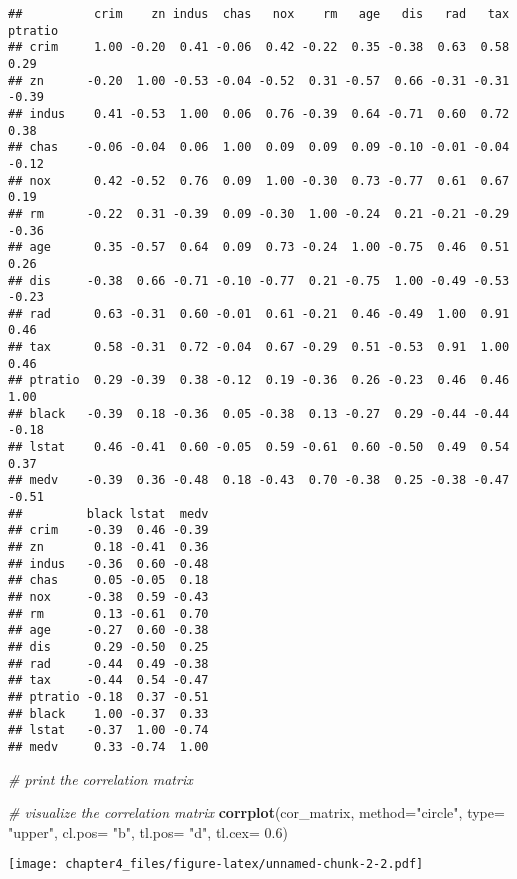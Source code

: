 \documentclass[
]{article}
\newenvironment{Shaded}{\begin{snugshade}}{\end{snugshade}}
\newcommand{\CommentTok}[1]{\textcolor[rgb]{0.56,0.35,0.01}{\textit{#1}}}
\newcommand{\DataTypeTok}[1]{\textcolor[rgb]{0.13,0.29,0.53}{#1}}
\newcommand{\FloatTok}[1]{\textcolor[rgb]{0.00,0.00,0.81}{#1}}
\newcommand{\KeywordTok}[1]{\textcolor[rgb]{0.13,0.29,0.53}{\textbf{#1}}}
\newcommand{\NormalTok}[1]{#1}
\newcommand{\StringTok}[1]{\textcolor[rgb]{0.31,0.60,0.02}{#1}}
\begin{document}
\begin{verbatim}
##          crim    zn indus  chas   nox    rm   age   dis   rad   tax ptratio
## crim     1.00 -0.20  0.41 -0.06  0.42 -0.22  0.35 -0.38  0.63  0.58    0.29
## zn      -0.20  1.00 -0.53 -0.04 -0.52  0.31 -0.57  0.66 -0.31 -0.31   -0.39
## indus    0.41 -0.53  1.00  0.06  0.76 -0.39  0.64 -0.71  0.60  0.72    0.38
## chas    -0.06 -0.04  0.06  1.00  0.09  0.09  0.09 -0.10 -0.01 -0.04   -0.12
## nox      0.42 -0.52  0.76  0.09  1.00 -0.30  0.73 -0.77  0.61  0.67    0.19
## rm      -0.22  0.31 -0.39  0.09 -0.30  1.00 -0.24  0.21 -0.21 -0.29   -0.36
## age      0.35 -0.57  0.64  0.09  0.73 -0.24  1.00 -0.75  0.46  0.51    0.26
## dis     -0.38  0.66 -0.71 -0.10 -0.77  0.21 -0.75  1.00 -0.49 -0.53   -0.23
## rad      0.63 -0.31  0.60 -0.01  0.61 -0.21  0.46 -0.49  1.00  0.91    0.46
## tax      0.58 -0.31  0.72 -0.04  0.67 -0.29  0.51 -0.53  0.91  1.00    0.46
## ptratio  0.29 -0.39  0.38 -0.12  0.19 -0.36  0.26 -0.23  0.46  0.46    1.00
## black   -0.39  0.18 -0.36  0.05 -0.38  0.13 -0.27  0.29 -0.44 -0.44   -0.18
## lstat    0.46 -0.41  0.60 -0.05  0.59 -0.61  0.60 -0.50  0.49  0.54    0.37
## medv    -0.39  0.36 -0.48  0.18 -0.43  0.70 -0.38  0.25 -0.38 -0.47   -0.51
##         black lstat  medv
## crim    -0.39  0.46 -0.39
## zn       0.18 -0.41  0.36
## indus   -0.36  0.60 -0.48
## chas     0.05 -0.05  0.18
## nox     -0.38  0.59 -0.43
## rm       0.13 -0.61  0.70
## age     -0.27  0.60 -0.38
## dis      0.29 -0.50  0.25
## rad     -0.44  0.49 -0.38
## tax     -0.44  0.54 -0.47
## ptratio -0.18  0.37 -0.51
## black    1.00 -0.37  0.33
## lstat   -0.37  1.00 -0.74
## medv     0.33 -0.74  1.00
\end{verbatim}

\begin{Shaded}
\begin{Highlighting}[]
\CommentTok{# print the correlation matrix}


\CommentTok{# visualize the correlation matrix}
\KeywordTok{corrplot}\NormalTok{(cor_matrix, }\DataTypeTok{method=}\StringTok{"circle"}\NormalTok{, }\DataTypeTok{type=} \StringTok{"upper"}\NormalTok{, }\DataTypeTok{cl.pos=} \StringTok{"b"}\NormalTok{, }\DataTypeTok{tl.pos=} \StringTok{"d"}\NormalTok{, }\DataTypeTok{tl.cex=} \FloatTok{0.6}\NormalTok{)}
\end{Highlighting}
\end{Shaded}

\texttt{[image: chapter4\_files/figure-latex/unnamed-chunk-2-2.pdf]}

\begin{Shaded}
\end{Shaded}
\end{document}
